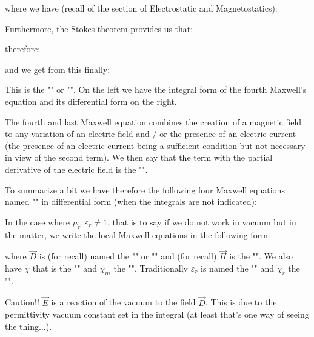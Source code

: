	where we have (recall of the section of Electrostatic and Magnetostatics):
	
	Furthermore, the Stokes theorem provides us that:
	
	therefore:
	
	and we get from this finally:
	
	This is the "" or "". On the left we have the integral form of the fourth Maxwell's equation and its differential form on the right.
	
	The fourth and last Maxwell equation combines the creation of a magnetic field to any variation of an electric field and / or the presence of an electric current (the presence of an electric current being a sufficient condition but not necessary in view of the second term). We then say that the term with the partial derivative of the electric field is the "".
	
	To summarize a bit we have therefore the following four Maxwell equations named "" in differential form (when the integrals are not indicated):
	
	In the case where $\mu_r,\varepsilon_r\neq 1$, that is to say if we do not work in vacuum but in the matter, we write the local Maxwell equations in the following form:
	
	where $\vec{D}$ is (for recall) named the "" or "" and (for recall) $\vec{H}$ is the "". We also have $\chi$ that is the "" and $\chi_m$ the "". Traditionally $\varepsilon_r$ is named the "" and $\chi_r$ the "".
	
	\begin{tcolorbox}[colback=red!5,borderline={1mm}{2mm}{red!5},arc=0mm,boxrule=0pt]
	\bcbombe Caution!! $\vec{E}$ is a reaction of the vacuum to the field $\vec{D}$. This is due to the permittivity vacuum constant  set in the integral (at least that's one way of seeing the thing...).
	\end{tcolorbox}
	
